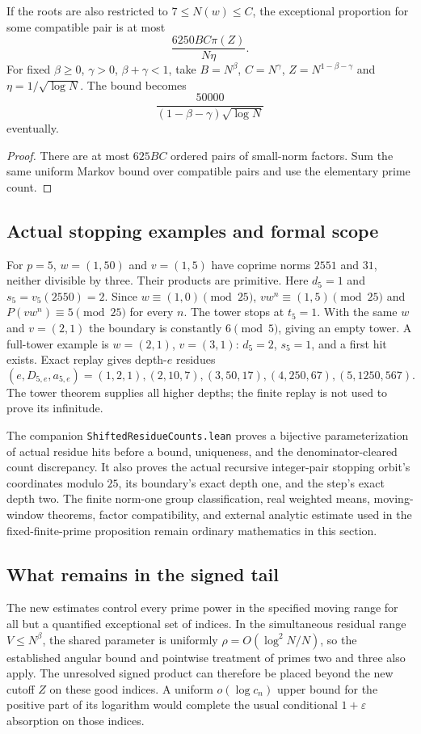 \begin{corollary}\label{cor:srw-pairs}
If the roots are also restricted to $7\le N(w)\le C$, the exceptional
proportion for some compatible pair is at most
\[
 \frac{6250BC\pi(Z)}{N\eta}.
\]
For fixed $\beta\ge0$, $\gamma>0$, $\beta+\gamma<1$, take
$B=N^\beta$, $C=N^\gamma$, $Z=N^{1-\beta-\gamma}$ and
$\eta=1/\sqrt{\log N}$. The bound becomes
\[
 \frac{50000}{(1-\beta-\gamma)\sqrt{\log N}}
\]
eventually.
\end{corollary}
\begin{proof}
There are at most $625BC$ ordered pairs of small-norm factors. Sum the same
uniform Markov bound over compatible pairs and use the elementary prime count.
\end{proof}

\subsection{Actual stopping examples and formal scope}
For $p=5$, $w=(1,50)$ and $v=(1,5)$ have coprime norms $2551$ and $31$,
neither divisible by three. Their products are primitive. Here $d_5=1$ and
$s_5=v_5(2550)=2$. Since $w\equiv(1,0)\pmod {25}$,
$vw^n\equiv(1,5)\pmod {25}$ and $P(vw^n)\equiv5\pmod {25}$ for every
$n$. The tower stops at $t_5=1$. With the same $w$ and $v=(2,1)$ the
boundary is constantly $6\pmod5$, giving an empty tower. A full-tower
example is $w=(2,1)$, $v=(3,1)$: $d_5=2$, $s_5=1$, and a first hit exists.
Exact replay gives depth-$e$ residues
\[
 (e,D_{5,e},a_{5,e})=(1,2,1),(2,10,7),(3,50,17),(4,250,67),(5,1250,567).
\]
The tower theorem supplies all higher depths; the finite replay is not used
to prove its infinitude.

The companion \texttt{ShiftedResidueCounts.lean} proves a bijective
parameterization of actual residue hits before a bound, uniqueness, and the
denominator-cleared count discrepancy. It also proves the actual recursive
integer-pair stopping orbit's coordinates modulo $25$, its boundary's exact
depth one, and the step's exact depth two. The finite norm-one group
classification, real weighted means, moving-window theorems, factor
compatibility, and external analytic estimate used in the fixed-finite-prime
proposition remain ordinary mathematics in this section.

\subsection{What remains in the signed tail}
The new estimates control every prime power in the specified moving range
for all but a quantified exceptional set of indices. In the simultaneous
residual range $V\le N^\beta$, the shared parameter is uniformly
$\rho=O(\log^2 N/N)$, so the established angular bound and pointwise
treatment of primes two and three also apply. The unresolved signed product
can therefore be placed beyond the new cutoff $Z$ on these good indices.
A uniform $o(\log c_n)$ upper bound for the positive part of its logarithm
would complete the usual
conditional $1+\varepsilon$ absorption on those indices.

